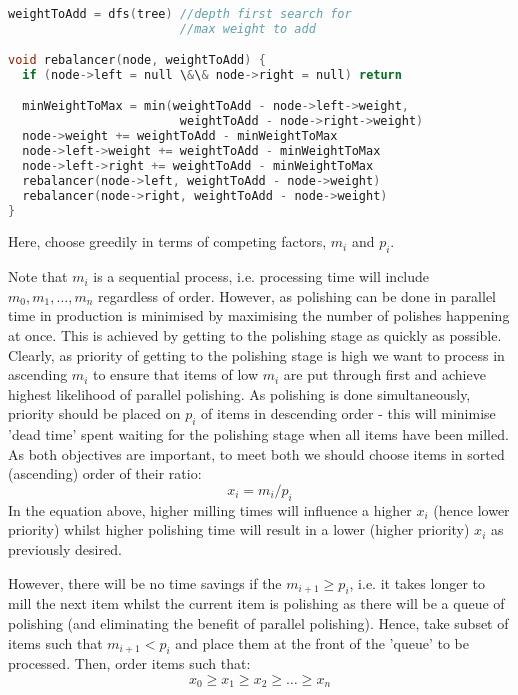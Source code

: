 \documentclass[11pt, a4paper]{article}
\begin{document}
{{{\begin{lstlisting}[frame = single, language =c]

weightToAdd = dfs(tree) //depth first search for
                        //max weight to add

void rebalancer(node, weightToAdd) {
  if (node->left = null \&\& node->right = null) return

  minWeightToMax = min(weightToAdd - node->left->weight,
                        weightToAdd - node->right->weight)
  node->weight += weightToAdd - minWeightToMax
  node->left->weight += weightToAdd - minWeightToMax
  node->left->right += weightToAdd - minWeightToMax
  rebalancer(node->left, weightToAdd - node->weight)
  rebalancer(node->right, weightToAdd - node->weight)
}
\end{lstlisting}

\vspace{20mm}

Here, choose greedily in terms of competing factors, $m_i$ and $p_i$.

Note that $m_i$ is a sequential process, i.e. processing time will include $m_0, m_1, \dots, m_n$
regardless of order. However, as polishing can be done in parallel time in production is minimised by maximising the number of polishes happening at once. This is achieved by getting to the polishing stage as quickly as possible.
Clearly, as priority of getting to the polishing stage is high we want to process in ascending $m_i$ to ensure that items of low $m_i$ are put through first and achieve highest likelihood of parallel polishing.
As polishing is done simultaneously, priority should be placed on $p_i$ of items in descending order - this will minimise 'dead time' spent waiting for the polishing stage when all items have been milled. As both objectives are important, to meet both we should choose items in sorted (ascending) order of their ratio:
\[ x_i = m_i/p_i \]
In the equation above, higher milling times will influence a higher $x_i$ (hence lower priority) whilst higher polishing time will result in a lower (higher priority) $x_i$ as previously desired.

However, there will be no time savings if the $m_{i+1} \ge p_i$, i.e. it takes longer to mill the next item whilst the current item is polishing as there will be a queue of polishing (and eliminating the benefit of parallel polishing).
Hence, take subset of items such that $m_{i+1} < p_i$ and place them at the front of the 'queue' to be processed. Then, order items such that:
\begin{equation}
 x_0 \ge x_1 \ge x_2 \ge \dots \ge x_n 
 \end{equation}

}}}
\end{document}

